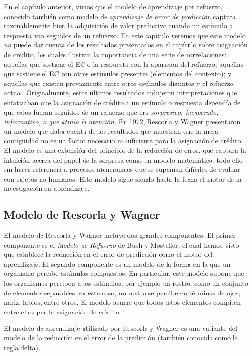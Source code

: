 \documentclass[
  letterpaper,
]{book}
\begin{document}
En el capítulo anterior, vimos que el modelo de aprendizaje por
refuerzo, conocido también como modelo de \emph{aprendizaje de error de
predicción} captura razonablemente bien la adquisición de valor
predictivo cuando un estímulo o respuesta van seguidos de un refuerzo.
En este capítulo veremos que este modelo \emph{no} puede dar cuenta de
los resultados presentados en el capítulo sobre asignación de crédito,
los cuales ilustran la importancia de una serie de correlaciones:
aquellas que sostiene el EC o la respuesta con la aparición del
refuerzo; aquellas que sostiene el EC con otros estímulos presentes
(elementos del contexto); y aquellas que existen previamente entre otros
estímulos distintos y el refuerzo actual. Originalmente, estos últimos
resultados indujeron interpretaciones que enfatizaban que la asignación
de crédito a un estímulo o respuesta dependía de que estos fueran
seguidos de un refuerzo que era \emph{sorpresivo, inesperado,
informativo, o que atraía la atención. } En 1972, Rescorla y Wagner
presentaron un modelo que daba cuenta de los resultados que muestran que
la mera contigüidad no es un factor necesario ni suficiente para la
asignación de crédito. El modelo es una extensión del principio de la
reducción de error, que captura la intuición acerca del papel de la
sorpresa como un modelo matemático: todo ello sin hacer referencia a
procesos atencionales que se suponían difíciles de evaluar con sujetos
no humanos. Este modelo sigue siendo hasta la fecha el motor de la
investigación en aprendizaje.

\subsection{Modelo de Rescorla y
Wagner}\label{modelo-de-rescorla-y-wagner}

El modelo de Rescorla y Wagner incluye dos grandes componentes. El
primer componente es el \emph{Modelo de Refuerzo} de Bush y Mosteller,
el cual hemos visto que establece la reducción en el error de predicción
como el motor del aprendizaje. El segundo componente es un modelo de la
forma en la que un organismo percibe estímulos compuestos. En
particular, este modelo supone que los organismos perciben a los
estímulos, por ejemplo un rostro, como un conjunto de elementos
separables: en este caso, un rostro se percibe en términos de ojos,
nariz, labios, entre otros. El modelo asume que todos estos elementos
compiten entre ellos por la asignación de crédito.

El modelo de aprendizaje utilizado por Rescorla y Wagner es una variante
del modelo de la reducción en el error de la predicción (también
conocido como la regla delta).
\end{document}
